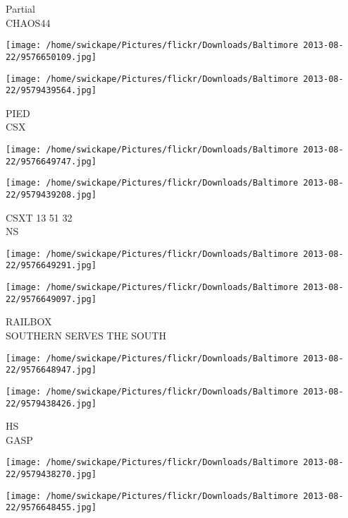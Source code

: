 \documentclass[10pt,letterpaper]{article}
\begin{document}
Partial\\
CHAOS44\\
\pagebreak

\texttt{[image: /home/swickape/Pictures/flickr/Downloads/Baltimore 2013-08-22/9576650109.jpg]}

\vspace{0.25in}
\texttt{[image: /home/swickape/Pictures/flickr/Downloads/Baltimore 2013-08-22/9579439564.jpg]}

PIED\\
CSX\\
\pagebreak

\texttt{[image: /home/swickape/Pictures/flickr/Downloads/Baltimore 2013-08-22/9576649747.jpg]}

\vspace{0.25in}
\texttt{[image: /home/swickape/Pictures/flickr/Downloads/Baltimore 2013-08-22/9579439208.jpg]}

CSXT 13 51 32\\
NS\\
\pagebreak

\texttt{[image: /home/swickape/Pictures/flickr/Downloads/Baltimore 2013-08-22/9576649291.jpg]}

\vspace{0.25in}
\texttt{[image: /home/swickape/Pictures/flickr/Downloads/Baltimore 2013-08-22/9576649097.jpg]}

RAILBOX\\
SOUTHERN SERVES THE SOUTH\\
\pagebreak

\texttt{[image: /home/swickape/Pictures/flickr/Downloads/Baltimore 2013-08-22/9576648947.jpg]}

\vspace{0.25in}
\texttt{[image: /home/swickape/Pictures/flickr/Downloads/Baltimore 2013-08-22/9579438426.jpg]}

HS\\
GASP\\
\pagebreak

\texttt{[image: /home/swickape/Pictures/flickr/Downloads/Baltimore 2013-08-22/9579438270.jpg]}

\vspace{0.25in}
\texttt{[image: /home/swickape/Pictures/flickr/Downloads/Baltimore 2013-08-22/9576648455.jpg]}
\end{document}
